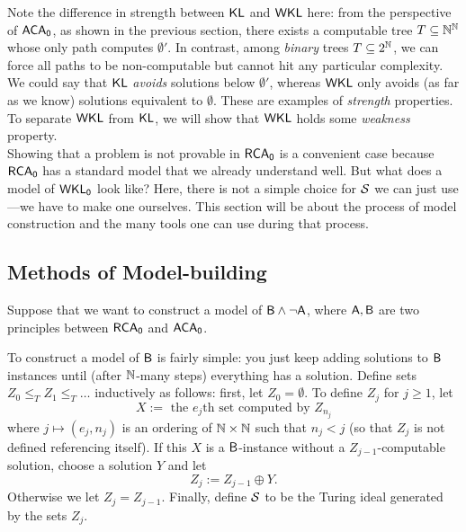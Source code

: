\documentclass{amsart}
\begin{document}
	Note the difference in strength between $\KL$ and $\sf{WKL}$ here: from the perspective of $\ACA$, as shown in the previous section, there exists a computable tree $T\subseteq \N^{\N}$ whose only path computes $\emptyset'$. In contrast, among \textit{binary} trees $T\subseteq 2^{\N}$, we can force all paths to be non-computable but cannot hit any particular complexity. We could say that $\KL$ \textit{avoids} solutions below $\emptyset'$, whereas $\sf{WKL}$ only avoids (as far as we know) solutions equivalent to $\emptyset$. These are examples of \textit{strength} properties. To separate $\sf{WKL}$ from $\KL$, we will show that $\sf{WKL}$ holds some \textit{weakness} property.\\
	
	Showing that a problem is not provable in $\RCA$ is a convenient case because $\RCA$ has a standard model that we already understand well. But what does a model of $\WKL$ look like? Here, there is not a simple choice for $\SS$ we can just use---we have to make one ourselves. This section will be about the process of model construction and the many tools one can use during that process.
	
	
	\subsection{Methods of Model-building}
	
	Suppose that we want to construct a model of $\sf{B}\^\neg \sf{A}$, where $\sf{A},\sf{B}$ are two principles between $\RCA$ and $\ACA$. 
	
	
	To construct a model of $\sf{B}$ is fairly simple: you just keep adding solutions to $\sf{B}$ instances until (after $\N$-many steps) everything has a solution. Define sets $Z_0\leq_T Z_1 \leq_T \dots$ inductively as follows: first, let $Z_0=\emptyset$. To define $Z_j$ for $j\geq 1$, let 
	$$X := \text{ the $e_j$th set computed by $Z_{n_j}$}$$
	where $j\mapsto (e_j,n_j)$ is an ordering of $\N\times \N$ such that $n_j<j$ (so that $Z_j$ is not defined referencing itself). If this $X$ is a $\sf{B}$-instance without a $Z_{j-1}$-computable solution, choose a solution $Y$ and let
	$$
	Z_j := Z_{j-1} \oplus Y.
	$$
	Otherwise we let $Z_j=Z_{j-1}$. Finally, define $\SS$ to be the Turing ideal generated by the sets $Z_j$.
	
\end{document}
